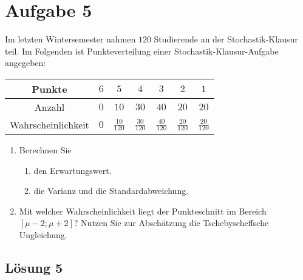 \documentclass[main.tex]{subfiles}
\begin{document}
\section{Aufgabe 5}
Im letzten Wintersemester nahmen $120$ Studierende an der Stochastik-Klausur teil. Im Folgenden ist Punkteverteilung einer Stochastik-Klausur-Aufgabe angegeben:
\begin{center}
\begin{tabular}{|c|c|c|c|c|c|c|} \hline
	Punkte & $6$ & $5$ & $4$ & $3$ & $2$ & $1$ \\ \hline
	Anzahl & $0$ & $10$ & $30$ & $40$ & $20$ & $20$ \\ \hline
	Wahrscheinlichkeit & $0$ & $\frac{10}{120}$ & $\frac{30}{120}$ & $\frac{40}{120}$ & $\frac{20}{120}$ & $\frac{20}{120}$ \\ \hline
\end{tabular}
\end{center}
\begin{enumerate}
\item Berechnen Sie 
\begin{enumerate}
	\item den Erwartungswert.
	\item die Varianz und die Standardabweichung.
\end{enumerate}
\item Mit welcher Wahrscheinlichkeit liegt der Punkteschnitt im Bereich $[\mu-2; \mu+2]$? Nutzen Sie zur Abschätzung die Tschebyscheffsche Ungleichung.
\end{enumerate}

\subsection{Lösung 5}
\end{document}

